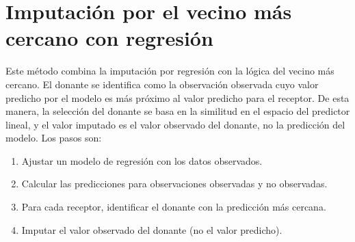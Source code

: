 \documentclass[
  spanish,
  12pt,
]{book}
\newenvironment{Shaded}{\begin{snugshade}}{\end{snugshade}}
\newcommand{\AttributeTok}[1]{\textcolor[rgb]{0.13,0.29,0.53}{#1}}
\newcommand{\FunctionTok}[1]{\textcolor[rgb]{0.13,0.29,0.53}{\textbf{#1}}}
\newcommand{\NormalTok}[1]{#1}
\newcommand{\OtherTok}[1]{\textcolor[rgb]{0.56,0.35,0.01}{#1}}
\newcommand{\SpecialCharTok}[1]{\textcolor[rgb]{0.81,0.36,0.00}{\textbf{#1}}}
\providecommand{\tightlist}{%
  \setlength{\itemsep}{0pt}\setlength{\parskip}{0pt}}
\begin{document}
\section{Imputación por el vecino más cercano con regresión}\label{sec-knn-regresion}

Este método combina la imputación por regresión con la lógica del vecino más cercano. El donante se identifica como la observación observada cuyo valor predicho por el modelo es más próximo al valor predicho para el receptor. De esta manera, la selección del donante se basa en la similitud en el espacio del predictor lineal, y el valor imputado es el valor observado del donante, no la predicción del modelo. Los pasos son:

\begin{enumerate}
\def\labelenumi{\arabic{enumi}.}
\tightlist
\item
  Ajustar un modelo de regresión con los datos observados.
\item
  Calcular las predicciones para observaciones observadas y no observadas.
\item
  Para cada receptor, identificar el donante con la predicción más cercana.
\item
  Imputar el valor observado del donante (no el valor predicho).
\end{enumerate}

\begin{Shaded}
\end{Shaded}
\end{document}
